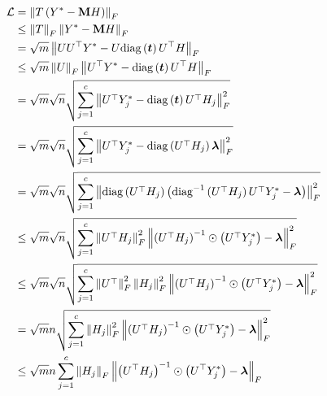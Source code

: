 \documentclass{article} %
\def\vlambda{{\bm\lambda}}
\begin{document}
	\begin{equation}
		\begin{aligned}
			\gL&=\left\|T\left(Y^*-\rmM H\right)\right\|_F\\
			&\leq\left\|T\right\|_F\left\|Y^*-\rmM H\right\|_F\\
			&=\sqrt{m}\left\|UU^{\top}Y^*-U\mathrm{diag}\left(\vt\right)U^{\top}H\right\|_F\\
			&\leq\sqrt{m}\left\|U\right\|_F\left\|U^{\top}Y^*-\mathrm{diag}\left(\vt\right)U^{\top}H\right\|_F\\
			&=\sqrt{m}\sqrt{n}\sqrt{\sum_{j=1}^c\left\|U^{\top}Y^*_j-\mathrm{diag}\left(\vt\right)U^{\top}H_j\right\|^2_F}\\
			&=\sqrt{m}\sqrt{n}\sqrt{\sum_{j=1}^c\left\|U^{\top}Y^*_j-\mathrm{diag}\left(U^{\top}H_j\right)\vlambda\right\|^2_F}\\
			&=\sqrt{m}\sqrt{n}\sqrt{\sum_{j=1}^c\left\|\mathrm{diag}\left(U^{\top}H_j\right)\left(\mathrm{diag}^{-1}\left(U^{\top}H_j\right)U^{\top}Y^*_j-\vlambda\right)\right\|^2_F}\\
			&\leq\sqrt{m}\sqrt{n}\sqrt{\sum_{j=1}^c\left\|U^{\top}H_j\right\|^2_F\left\|\left(U^{\top}H_j\right)^{-1}\odot\left(U^{\top}Y^*_j\right)-\vlambda\right\|^2_F}\\
			&\leq\sqrt{m}\sqrt{n}\sqrt{\sum_{j=1}^c\left\|U^{\top}\right\|^2_F\left\|H_j\right\|^2_F\left\|\left(U^{\top}H_j\right)^{-1}\odot\left(U^{\top}Y^*_j\right)-\vlambda\right\|^2_F}\\
			&=\sqrt{m}n\sqrt{\sum_{j=1}^c\left\|H_j\right\|^2_F\left\|\left(U^{\top}H_j\right)^{-1}\odot\left(U^{\top}Y^*_j\right)-\vlambda\right\|^2_F}\\
			&\leq\sqrt{m}n\sum_{j=1}^c\left\|H_j\right\|_F\left\|\left(U^{\top}H_j\right)^{-1}\odot\left(U^{\top}Y^*_j\right)-\vlambda\right\|_F
		\end{aligned}
	\end{equation}
	
\end{document}
